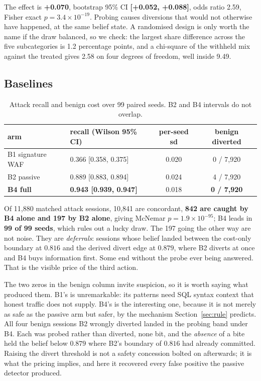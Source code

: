 \documentclass[runningheads]{llncs}
\begin{document}
The effect is \textbf{+0.070}, bootstrap 95\% CI \textbf{[+0.052, +0.088]}, odds
ratio 2.59, Fisher exact \textbf{$p = 3.4 \times 10^{-19}$}. Probing causes
diversions that would not otherwise have happened, at the same belief state. A
randomised design is only worth the name if the draw balanced, so we check: the
largest share difference across the five subcategories is 1.2 percentage points, and
a chi-square of the withheld mix against the treated gives 2.58 on four degrees of
freedom, well inside 9.49.

\subsection{Baselines}

\begin{table}[t]
\centering
\caption{Attack recall and benign cost over 99 paired seeds. B2 and B4 intervals do
not overlap.}
\label{tab:baselines}
\setlength{\tabcolsep}{10pt}
\begin{tabular}{@{}l l c c@{}}
\toprule
arm & recall (Wilson 95\% CI) & per-seed sd & benign diverted \\
\midrule
B1 signature WAF & 0.366 [0.358, 0.375] & 0.020 & 0 / 7,920 \\
B2 passive       & 0.889 [0.883, 0.894] & 0.024 & 4 / 7,920 \\
\textbf{B4 full} & \textbf{0.943 [0.939, 0.947]} & 0.018 & \textbf{0 / 7,920} \\
\bottomrule
\end{tabular}
\end{table}

Of 11,880 matched attack sessions, 10,841 are concordant, \textbf{842 are caught by
B4 alone and 197 by B2 alone}, giving McNemar $p = 1.9 \times 10^{-95}$; B4 leads in
\textbf{99 of 99 seeds}, which rules out a lucky draw. The 197 going the other way
are not noise. They are \emph{deferrals}: sessions whose belief landed between the
cost-only boundary at $0.816$ and the derived divert edge at $0.879$, where B2
diverts at once and B4 buys information first. Some end without the probe ever being
answered. That is the visible price of the third action.

The two zeros in the benign column invite suspicion, so it is worth saying what
produced them. B1's is unremarkable: its patterns need SQL syntax context that honest
traffic does not supply. B4's is the interesting one, because it is not merely as
safe as the passive arm but safer, by the mechanism Section~\ref{sec:rule} predicts.
All four benign sessions B2 wrongly diverted landed in the probing band under B4.
Each was probed rather than diverted, none bit, and the \emph{absence} of a bite held
the belief below $0.879$ where B2's boundary of $0.816$ had already committed.
Raising the divert threshold is not a safety concession bolted on afterwards; it is
what the pricing implies, and here it recovered every false positive the passive
detector produced.
\end{document}
